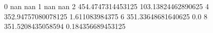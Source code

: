 0 nan nan
1 nan nan
2 454.4747314453125 103.13824462890625
4 352.94757080078125 1.611083984375
6 351.33648681640625 0.0
8 351.5208435058594 0.184356689453125
